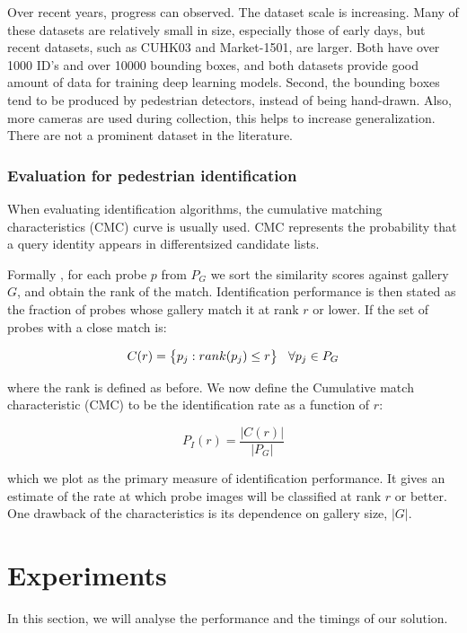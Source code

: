 \documentclass[12pt, a4paper, titlepage,twoside,openright]{article}
\newcommand\abs[1]{\left|#1\right|}
\begin{document}
Over recent years, progress can observed. The dataset scale is increasing. Many of these datasets are relatively small in size, especially those of early days, but recent datasets, such as CUHK03 and Market-1501, are larger. Both have over 1000 ID's and over 10000 bounding boxes, and both datasets provide good amount of data for training deep learning models. Second, the bounding boxes tend to be produced by pedestrian detectors, instead of being hand-drawn. Also, more cameras are used during collection, this helps to increase generalization. There are not a prominent dataset in the literature.

\subsubsection{Evaluation for pedestrian identification}


When evaluating identification algorithms, the cumulative matching characteristics (CMC) curve is usually used. CMC represents the probability that a query identity appears in differentsized candidate lists.

Formally \cite{faceCMC}, for each probe $p$ from $P_{G}$ we sort the similarity scores against gallery $G$, and obtain the rank of the match. Identification performance is then stated as the fraction of probes whose gallery match it at rank $r$  or lower. If the set of probes with a close match is:

$$ C(r) = \big\{ p_{j}: rank(p_{j}) \leq r  \bigr\} \hspace{0.3cm} \forall p_{j} \in P_{G}  $$

where the rank is defined as before. We now define the Cumulative match characteristic (CMC) to be the identification rate as a function of $r$:

$$ P_{I}(r) = \dfrac{\abs{C(r)}}{\abs{P_{G}}} $$

which we plot as the primary measure of identification performance. It gives an estimate of the rate at which probe images will be classified at rank $r$ or better. One drawback of the characteristics is its dependence on gallery size, $\abs{G}$.



\section{Experiments}

In this section, we will analyse the performance and the timings of our solution.
\end{document}
